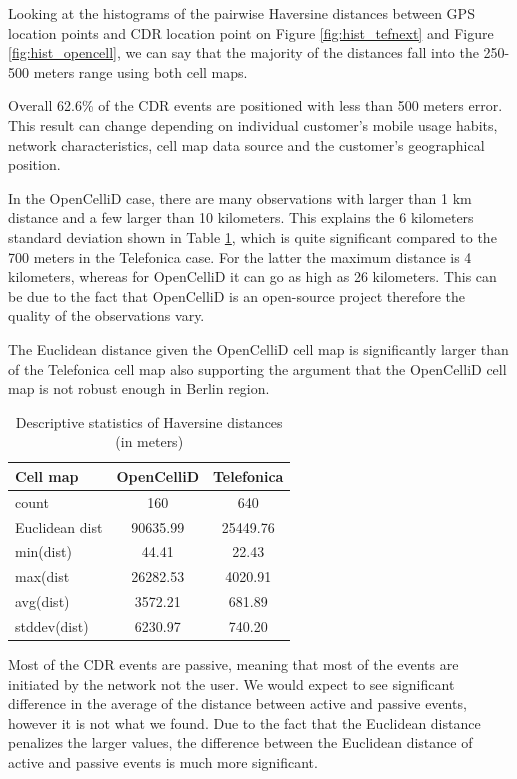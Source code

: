 Looking at the histograms of the pairwise Haversine distances between GPS location points and CDR location point on Figure \ref{fig:hist_tefnext} and Figure \ref{fig:hist_opencell}, we can say that the majority of the distances fall into the 250-500 meters range using both cell maps. 

Overall 62.6\% of the CDR events are positioned with less than 500 meters error. This result can change depending on individual customer's mobile usage habits, network characteristics, cell map data source and the customer's geographical position.

In the OpenCelliD case, there are many observations with larger than 1 km distance and a few larger than 10 kilometers. This explains the 6 kilometers standard deviation shown in Table \ref{tab:dist_stats}, which is quite significant compared to the 700 meters in the Telefonica case. For the latter the maximum distance is 4 kilometers, whereas for OpenCelliD it can go as high as 26 kilometers. This can be due to the fact that OpenCelliD is an open-source project therefore the quality of the observations vary.

The Euclidean distance given the OpenCelliD cell map is significantly larger than of the Telefonica cell map also supporting the argument that the OpenCelliD cell map is not robust enough in Berlin region.

\begin{table}[h]
    \centering
    \begin{tabular}{|l|c|c|}
    	\hline
        Cell map & \textbf{ OpenCelliD} & \textbf{Telefonica} \\
        \hline 
        count & 160 & 640 \\
        \hline
        Euclidean dist & 90635.99 & 25449.76 \\
        \hline
        min(dist) & 44.41 & 22.43 \\
        \hline
        max(dist & 26282.53 & 4020.91 \\
        \hline
        avg(dist) & 3572.21 & 681.89 \\
        \hline
        stddev(dist) & 6230.97 & 740.20 \\
        \hline
    \end{tabular}
    \caption{Descriptive statistics of Haversine distances (in meters)}
    \label{tab:dist_stats}
\end{table}

Most of the CDR events are passive, meaning that most of the events are initiated by the network not the user. We would expect to see significant difference in the average of the distance between active and passive events, however it is not what we found. Due to the fact that the Euclidean distance penalizes the larger values, the difference between the Euclidean distance of active and passive events is much more significant.


